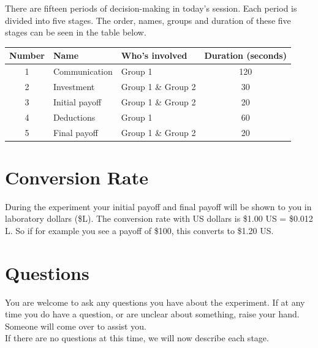 \documentclass[12pt]{article}
\begin{document}
There are fifteen periods of decision-making in today's session.  Each period is divided into five stages.  The order, names, groups and duration of these five stages can be seen in the table below. 

\begin{table}[H]
\centering
\begin{tabular}{cllc}
\toprule

{\bf Number} & {\bf Name} & {\bf Who's involved} & {\bf Duration (seconds)}\\
\hline
1 & Communication & Group 1 & 120\\
2 & Investment & Group 1 \& Group 2 & 30\\
3 & Initial payoff & Group 1 \& Group 2 & 20\\
4 & Deductions & Group 1 & 60\\
5 & Final payoff & Group 1 \& Group 2 & 20\\

\bottomrule
\end{tabular}
\end{table}

\section*{Conversion Rate}

During the experiment your initial payoff and final payoff will be shown to you in laboratory dollars (\$L).  The conversion rate with US dollars is \$1.00 US = \$0.012 L. So if for example you see a payoff of \$100, this converts to \$1.20 US. 


\section*{Questions}

You are welcome to ask any questions you have about the experiment.  If at any time you do have a question, or are unclear about something, raise your hand. Someone will come over to assist you.\\

If there are no questions at this time, we will now describe each stage.


   

\newpage
\end{document}
